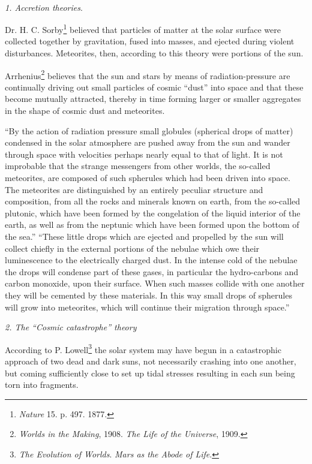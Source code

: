 \documentclass[a4paper, 12pt, oneside]{article}
\begin{document}
\paragraph{}
\centerline{\emph{1. Accretion theories}.}
Dr. H. C. Sorby\footnote{\emph{Nature} 15. p. 497. 1877.} believed that particles of matter at the solar surface were collected together by gravitation, fused into masses, and ejected during violent disturbances. Meteorites, then, according to this theory were portions of the sun.

Arrhenius\footnote{\emph{Worlds in the Making}, 1908. \emph{The Life of the Universe}, 1909.} believes that the sun and stars by means of radiation-pressure are continually driving out small particles of cosmic ``dust'' into space and that these become mutually attracted, thereby in time forming larger or smaller aggregates in the shape of cosmic dust and meteorites.

``By the action of radiation pressure small globules (spherical drops of matter) condensed in the solar atmosphere are pushed away from the sun and wander through space with velocities perhaps nearly equal to that of light. It is not improbable that the strange messengers from other worlds, the so-called meteorites, are composed of such spherules which had been driven into space. The meteorites are distinguished by an entirely peculiar structure and composition, from all the rocks and minerals known on earth, from the so-called plutonic, which have been formed by the congelation of the liquid interior of the earth, as well as from the neptunic which have been formed upon the bottom of the sea.'' ``These little drops which are ejected and propelled by the sun will collect chiefly in the external portions of the nebulae which owe their luminescence to the electrically charged dust. In the intense cold of the nebulae the drops will condense part of these gases, in particular the hydro-carbons and carbon monoxide, upon their surface. When such masses collide with one another they will be cemented by these materials. In this way small drops of spherules will grow into meteorites, which will continue their migration through space.''

\bigskip
\centerline{\emph{2. The ``Cosmic catastrophe'' theory}}

According to P. Lowell\footnote{\emph{The Evolution of Worlds}. \emph{Mars as the Abode of Life}.} the solar system may have begun in a catastrophic approach of two dead and dark suns, not necessarily crashing into one another, but coming sufficiently close to set up tidal stresses resulting in each sun being torn into fragments.
\end{document}
